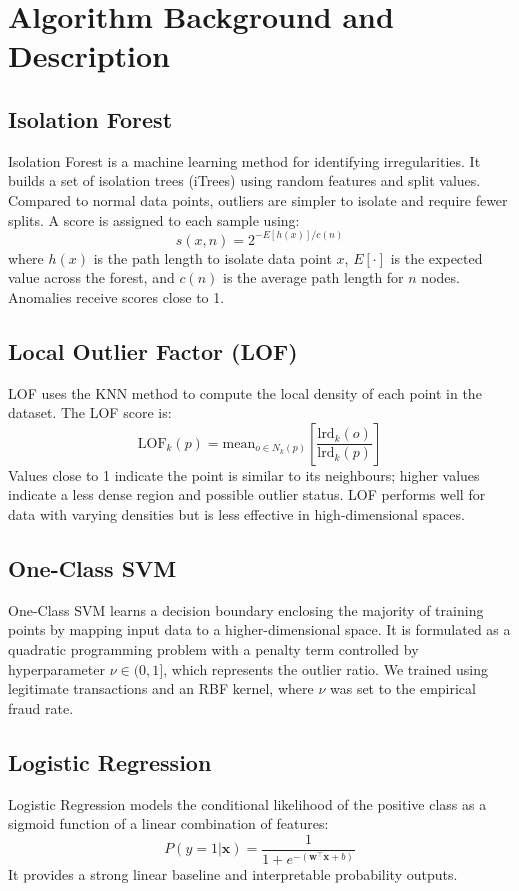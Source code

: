 \documentclass[conference]{IEEEtran}
\begin{document}
\section{Algorithm Background and Description}

\subsection{Isolation Forest}
Isolation Forest is a machine learning method for identifying irregularities. It builds a set of isolation trees (iTrees) using random features and split values. Compared to normal data points, outliers are simpler to isolate and require fewer splits. A score is assigned to each sample using:
\[
s(x, n) = 2^{-E[h(x)]/c(n)}
\]
where $h(x)$ is the path length to isolate data point $x$, $E[\cdot]$ is the expected value across the forest, and $c(n)$ is the average path length for $n$ nodes. Anomalies receive scores close to 1.

\subsection{Local Outlier Factor (LOF)}
LOF uses the KNN method to compute the local density of each point in the dataset. The LOF score is:
\[
\text{LOF}_k(p) = \text{mean}_{o \in N_k(p)} \left[ \frac{\text{lrd}_k(o)}{\text{lrd}_k(p)} \right]
\]
Values close to 1 indicate the point is similar to its neighbours; higher values indicate a less dense region and possible outlier status. LOF performs well for data with varying densities but is less effective in high-dimensional spaces.

\subsection{One-Class SVM}
One-Class SVM learns a decision boundary enclosing the majority of training points by mapping input data to a higher-dimensional space. It is formulated as a quadratic programming problem with a penalty term controlled by hyperparameter $\nu \in (0,1]$, which represents the outlier ratio. We trained using legitimate transactions and an RBF kernel, where $\nu$ was set to the empirical fraud rate.

\subsection{Logistic Regression}
Logistic Regression models the conditional likelihood of the positive class as a sigmoid function of a linear combination of features:
\[
P(y=1|\mathbf{x}) = \frac{1}{1 + e^{-(\mathbf{w}^\top \mathbf{x} + b)}}
\]
It provides a strong linear baseline and interpretable probability outputs.
\end{document}
